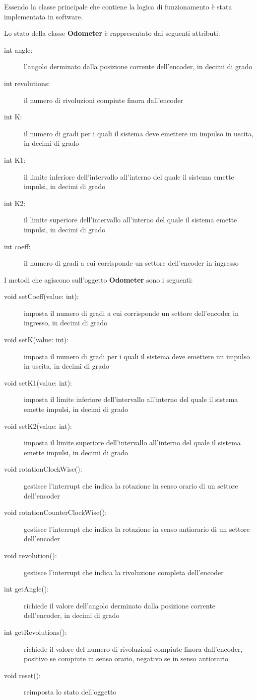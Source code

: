 \documentclass [11pt,a4paper,oneside]{paper}
\newcommand{\component}[1]{\textbf{#1}}
\begin{document}
Essendo la classe principale che contiene la logica di funzionamento
è stata implementata in software.

Lo stato della classe \component{Odometer} è rappresentato
dai seguenti attributi:

\begin{description}
\item[int angle:] l'angolo derminato dalla posizione corrente dell'encoder,
     in decimi di grado
\item[int revolutions:] il numero di rivoluzioni compiute finora dall'encoder
\item[int K:] il numero di gradi per i quali il sistema deve emettere un
     impulso in uscita, in decimi di grado
\item[int K1:] il limite inferiore dell'intervallo all'interno del quale
     il sistema emette impulsi, in decimi di grado
\item[int K2:] il limite superiore dell'intervallo all'interno del quale
     il sistema emette impulsi, in decimi di grado
\item[int coeff:] il numero di gradi a cui corrisponde un settore
     dell'encoder in ingresso
\end{description}

I metodi che agiscono sull'oggetto \component{Odometer} sono i seguenti:

\begin{description}
\item[void setCoeff(value: int):] imposta il numero di gradi a
     cui corrisponde un settore dell'encoder in ingresso, in decimi
     di grado
\item[void setK(value: int):] imposta il numero di gradi per i
     quali il sistema deve emettere un impulso in uscita, in decimi
     di grado
\item[void setK1(value: int):] imposta il limite inferiore
     dell'intervallo all'interno del quale il sistema emette impulsi,
     in decimi di grado
\item[void setK2(value: int):] imposta il limite superiore 
     dell'intervallo all'interno del quale il sistema emette impulsi,
     in decimi di grado
\item[void rotationClockWise():] gestisce l'interrupt che indica la
     rotazione in senso orario di un settore dell'encoder
\item[void rotationCounterClockWise():] gestisce l'interrupt che indica
     la rotazione in senso antiorario di un settore dell'encoder
\item[void revolution():] gestisce l'interrupt che indica la
     rivoluzione completa dell'encoder
\item[int getAngle():] richiede il valore dell'angolo derminato
     dalla posizione corrente dell'encoder, in decimi di grado
\item[int getRevolutions():] richiede il valore del numero di rivoluzioni
    compiute finora dall'encoder, positivo se compiute in senso orario,
    negativo se in senso antiorario
\item[void reset():] reimposta lo stato dell'oggetto
\end{description}
\end{document}
